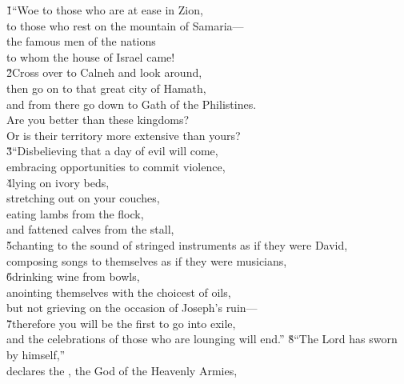 \begin{poetry}
\poeml {}
\v{1}``Woe to those who are at ease in Zion, \\
\poemll    to those who rest on the mountain of Samaria--- \\
\poeml the famous men of the nations \\
\poemll    to whom the house of Israel came! \\
\poeml \v{2}Cross over to Calneh and look around, \\
\poemll    then go on to that great city of Hamath, \\
\poemlll       and from there go down to Gath of the Philistines. \\
\poeml Are you better than these kingdoms? \\
\poemll    Or is their territory more extensive than yours? \\
\poeml \v{3}``Disbelieving that a day of evil will come, \\
\poemll    embracing opportunities to commit violence, \\
\poeml \v{4}lying on ivory beds, \\
\poemll    stretching out on your couches, \\
\poeml eating lambs from the flock, \\
\poemll    and fattened calves from the stall, \\
\poeml \v{5}chanting to the sound of stringed instruments as if they were David, \\
\poemll    composing songs to themselves as if they were musicians, \\
\poeml \v{6}drinking wine from bowls, \\
\poemll    anointing themselves with the choicest of oils, \\
\poemlll       but not grieving on the occasion of Joseph's ruin--- \\
\poeml \v{7}therefore you will be the first to go into exile, \\
\poemll    and the celebrations of those who are lounging will end.''
\poeml \v{8}``The Lord  has sworn by himself,'' \\
\poemll    declares the , the God of the Heavenly Armies, \\

\end{poetry}
